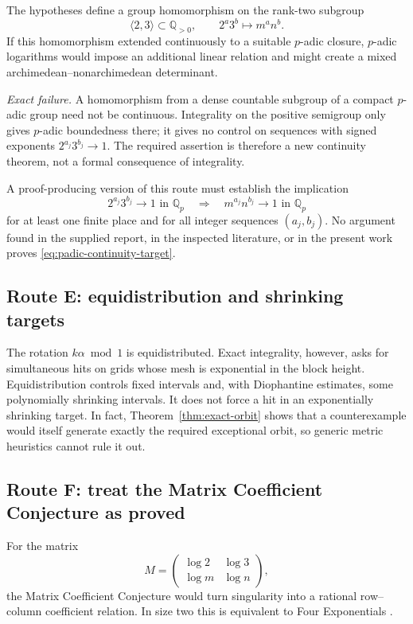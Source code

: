 \documentclass[11pt]{article}
\theoremstyle{definition}
\theoremstyle{remark}
\newcommand{\Q}{\mathbb Q}
\begin{document}
The hypotheses define a group homomorphism on the rank-two subgroup
\[
 \langle2,3\rangle\subset\Q_{>0},
 \qquad 2^a3^b\longmapsto m^an^b.
\]
If this homomorphism extended continuously to a suitable $p$-adic closure, $p$-adic
logarithms would impose an additional linear relation and might create a mixed
archimedean--nonarchimedean determinant.

\emph{Exact failure.}  A homomorphism from a dense countable subgroup of a compact
$p$-adic group need not be continuous.  Integrality on the positive semigroup only gives
$p$-adic boundedness there; it gives no control on sequences with signed exponents
$2^{a_j}3^{b_j}\to1$.  The required assertion is therefore a new continuity theorem, not a
formal consequence of integrality.

A proof-producing version of this route must establish the implication
\begin{equation}
 2^{a_j}3^{b_j}\to1\text{ in }\Q_p
 \quad\Longrightarrow\quad
 m^{a_j}n^{b_j}\to1\text{ in }\Q_p
 \label{eq:padic-continuity-target}
\end{equation}
for at least one finite place and for all integer sequences $(a_j,b_j)$.  No argument found
in the supplied report, in the inspected literature, or in the present work proves
\eqref{eq:padic-continuity-target}.

\subsection{Route E: equidistribution and shrinking targets}

The rotation $k\alpha\bmod1$ is equidistributed.  Exact integrality, however, asks for
simultaneous hits on grids whose mesh is exponential in the block height.  Equidistribution
controls fixed intervals and, with Diophantine estimates, some polynomially shrinking
intervals.  It does not force a hit in an exponentially shrinking target.  In fact,
Theorem~\ref{thm:exact-orbit} shows that a counterexample would itself generate exactly the
required exceptional orbit, so generic metric heuristics cannot rule it out.

\subsection{Route F: treat the Matrix Coefficient Conjecture as proved}

For the matrix
\[
 M=\begin{pmatrix}\log2&\log3\\\log m&\log n\end{pmatrix},
\]
the Matrix Coefficient Conjecture would turn singularity into a rational row--column
coefficient relation.  In size two this is equivalent to Four Exponentials
\cite{DasguptaKakde2024}.
\end{document}
